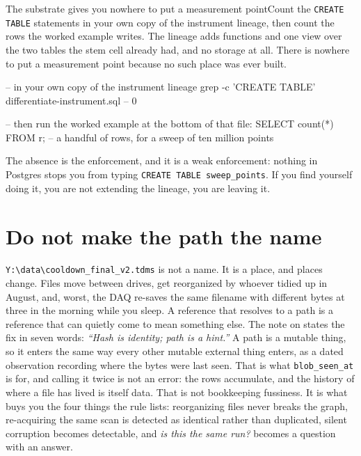 \begin{Correspondence}{The substrate gives you nowhere to put a measurement point}{Count the \texttt{CREATE TABLE} statements in your own copy of the instrument lineage, then count the rows the worked example writes.}
The lineage adds functions and one view over the two tables the stem cell already had, and no storage at all. There is nowhere to put a measurement point because no such place was ever built.
\begin{Check}
-- in your own copy of the instrument lineage
grep -c 'CREATE TABLE' differentiate-instrument.sql   -- 0

-- then run the worked example at the bottom of that file:
SELECT count(*) FROM r;   -- a handful of rows, for a sweep of ten million points
\end{Check}
The absence is the enforcement, and it is a weak enforcement: nothing in Postgres stops you from typing \texttt{CREATE TABLE sweep\_points}. If you find yourself doing it, you are not extending the lineage, you are leaving it.
\end{Correspondence}

\section{Do not make the path the name}

\texttt{Y:\textbackslash data\textbackslash cooldown\_final\_v2.tdms} is not a name. It is a place, and places change. Files move between drives, get reorganized by whoever tidied up in August, and, worst, the DAQ re-saves the same filename with different bytes at three in the morning while you sleep. A reference that resolves to a path is a reference that can quietly come to mean something else. The note on  states the fix in seven words: \textit{``Hash is identity; path is a hint.''} A path is a mutable thing, so it enters the same way every other mutable external thing enters, as a dated observation recording where the bytes were last seen. That is what \texttt{blob\_seen\_at} is for, and calling it twice is not an error: the rows accumulate, and the history of where a file has lived is itself data. That is not bookkeeping fussiness. It is what buys you the four things the rule lists: reorganizing files never breaks the graph, re-acquiring the same scan is detected as identical rather than duplicated, silent corruption becomes detectable, and \textit{is this the same run?} becomes a question with an answer.

